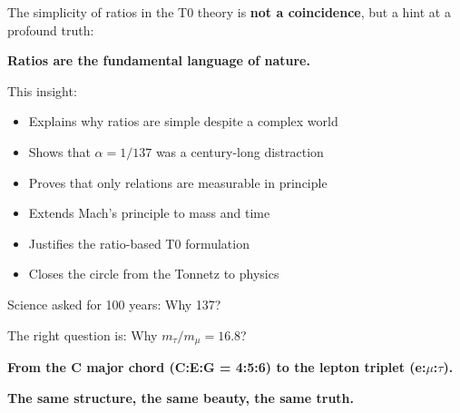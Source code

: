 \begin{tcolorbox}[colback=blue!5!white,colframe=blue!75!black,title=\textbf{Conclusion}]
	The simplicity of ratios in the T0 theory is \textbf{not a coincidence}, but a hint at a profound truth:
	
	\textbf{Ratios are the fundamental language of nature.}
	
	This insight:
	\begin{itemize}[nosep]
		\item Explains why ratios are simple despite a complex world
		\item Shows that $\alpha = 1/137$ was a century-long distraction
		\item Proves that only relations are measurable in principle
		\item Extends Mach's principle to mass and time
		\item Justifies the ratio-based T0 formulation
		\item Closes the circle from the Tonnetz to physics
	\end{itemize}
	
	\vspace{0.5cm}
	
	Science asked for 100 years: Why 137?
	
	The right question is: Why $m_\tau/m_\mu = 16.8$?
	
	\vspace{0.5cm}
	
	\textbf{From the C major chord (C:E:G = 4:5:6) to the lepton triplet (e:$\mu$:$\tau$).}
	
	\textbf{The same structure, the same beauty, the same truth.}
\end{tcolorbox}


